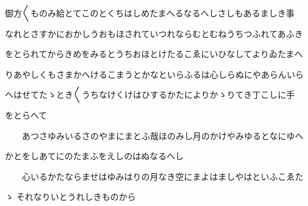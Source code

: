 \documentclass[a4paper,11pt,landscape]{ltjtarticle}
\begin{document}
\par\medskip
御方〱ものみ給とてこのとくちはしめたまへるなるへしさしもあるましき事
\par\medskip
なれとさすかにおかしうおもほされていつれならむとむねうちつふれてあふき
\par\medskip
をとられてからきめをみるとうちおほとけたるこゑにいひなしてよりゐたまへ
\par\medskip
りあやしくもさまかへけるこまうとかなといらふるは心しらぬにやあらんいら
\par\medskip
へはせてたゝとき〱うちなけくけはひするかたによりかゝりてき丁こしに手
\par\medskip
をとらへて
\par\medskip
　　あつさゆみいるさのやまにまとふ哉ほのみし月のかけやみゆるとなにゆへ
\par\medskip
かとをしあてにのたまふをえしのはぬなるへし
\par\medskip
　　心いるかたならませはゆみはりの月なき空にまよはましやはといふこゑた
\par\medskip
ゝ それなりいとうれしきものから
\par\medskip
\end{document}
